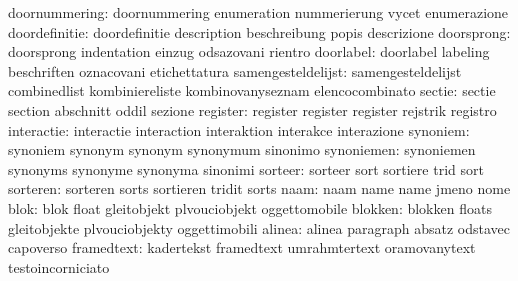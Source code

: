             doornummering: doornummering             enumeration
                           nummerierung              vycet
                           enumerazione
            doordefinitie: doordefinitie             description
                           beschreibung              popis
                           descrizione
               doorsprong: doorsprong                indentation
                           einzug                    odsazovani
                           rientro
                doorlabel: doorlabel                 labeling
                           beschriften               oznacovani
                           etichettatura
       samengesteldelijst: samengesteldelijst        combinedlist
                           kombiniereliste           kombinovanyseznam
                           elencocombinato
                   sectie: sectie                    section
                           abschnitt                 oddil
                           sezione
                 register: register                  register
                           register                  rejstrik
                           registro
               interactie: interactie                interaction
                           interaktion               interakce
                           interazione
                 synoniem: synoniem                  synonym
                           synonym                   synonymum
                           sinonimo
               synoniemen: synoniemen                synonyms
                           synonyme                  synonyma
                           sinonimi
                  sorteer: sorteer                   sort
                           sortiere                  trid
                           sort                      %
                 sorteren: sorteren                  sorts
                           sortieren                 tridit
                           sorts                     %
                     naam: naam                      name
                           name                      jmeno
                           nome
                     blok: blok                      float
                           gleitobjekt               plvouciobjekt
                           oggettomobile
                  blokken: blokken                   floats
                           gleitobjekte              plvouciobjekty
                           oggettimobili
                   alinea: alinea                    paragraph
                           absatz                    odstavec
                           capoverso
               framedtext: kadertekst                framedtext
                           umrahmtertext             oramovanytext
                           testoincorniciato

